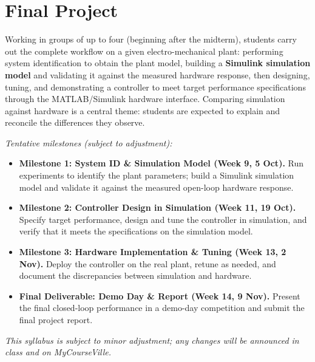 \documentclass[11pt]{article}
\begin{document}
\section{Final Project}
Working in groups of up to four (beginning after the midterm), students carry out the
complete workflow on a given electro-mechanical plant: performing system identification
to obtain the plant model, building a \textbf{Simulink simulation model} and validating
it against the measured hardware response, then designing, tuning, and demonstrating a
controller to meet target performance specifications through the MATLAB/Simulink
hardware interface. Comparing simulation against hardware is a central theme: students
are expected to explain and reconcile the differences they observe.

\emph{Tentative milestones (subject to adjustment):}
\begin{itemize}
    \item \textbf{Milestone 1: System ID \& Simulation Model (Week 9, 5 Oct).} Run
          experiments to identify the plant parameters; build a Simulink simulation model
          and validate it against the measured open-loop hardware response.
    \item \textbf{Milestone 2: Controller Design in Simulation (Week 11, 19 Oct).}
          Specify target performance, design and tune the controller in simulation, and
          verify that it meets the specifications on the simulation model.
    \item \textbf{Milestone 3: Hardware Implementation \& Tuning (Week 13, 2 Nov).}
          Deploy the controller on the real plant, retune as needed, and document the
          discrepancies between simulation and hardware.
    \item \textbf{Final Deliverable: Demo Day \& Report (Week 14, 9 Nov).} Present the
          final closed-loop performance in a demo-day competition and submit the final
          project report.
\end{itemize}

\vspace{6pt}
{\small\color{brandgray}\textit{This syllabus is subject to minor adjustment;
any changes will be announced in class and on MyCourseVille.}}
\end{document}

